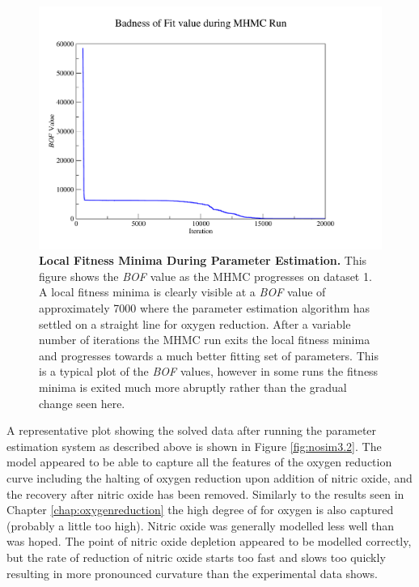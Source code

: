 \begin{figure}[tbp]
 \centering
 \includegraphics[width=15cm, trim=0.5cm 1cm 3cm 1cm, clip=true]{./06-noreduction/data/ds3-bof.pdf}
 \caption[{Local Fitness Minima During Parameter Estimation.}]{{\bf Local Fitness Minima During Parameter Estimation.} This figure shows the \textit{BOF} value as the MHMC progresses on dataset 1. A local fitness minima is clearly visible at a \textit{BOF} value of approximately 7000 where the parameter estimation algorithm has settled on a straight line for oxygen reduction. After a variable number of iterations the MHMC run exits the local fitness minima and progresses towards a much better fitting set of parameters. This is a typical plot of the \textit{BOF} values, however in some runs the fitness minima is exited much more abruptly rather than the gradual change seen here.}
 \label{fig:nosim3-bof}
\end{figure}

A representative plot showing the solved data after running the parameter estimation system as described above is shown in Figure \ref{fig:nosim3.2}. The model appeared to be able to capture all the features of the oxygen reduction curve including the halting of oxygen reduction upon addition of nitric oxide, and the recovery after nitric oxide has been removed. Similarly to the results seen in Chapter \ref{chap:oxygenreduction} the high degree of \cbbthree{} for oxygen is also captured (probably a little too high). Nitric oxide was generally modelled less well than was hoped. The point of nitric oxide depletion appeared to be modelled correctly, but the rate of reduction of nitric oxide starts too fast and slows too quickly resulting in more pronounced curvature than the experimental data shows.

